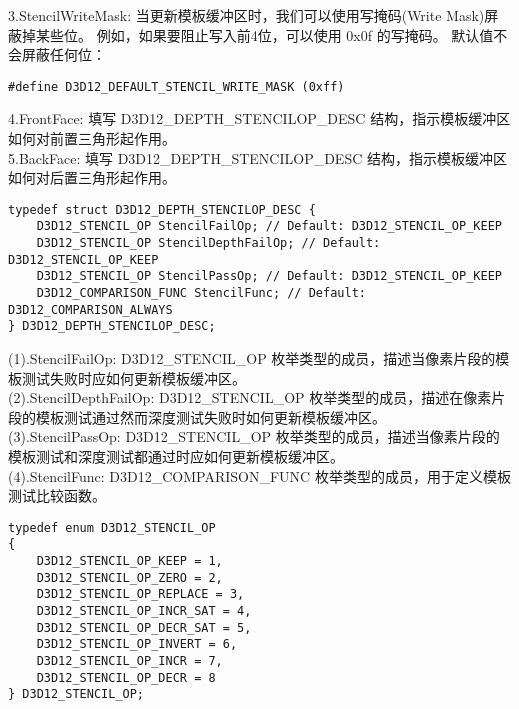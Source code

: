 \begin{flushleft}
3.StencilWriteMask: 当更新模板缓冲区时，我们可以使用写掩码(Write Mask)屏蔽掉某些位。 例如，如果要阻止写入前4位，可以使用 0x0f 的写掩码。 默认值不会屏蔽任何位：\\
\end{flushleft}
\begin{lstlisting}
#define D3D12_DEFAULT_STENCIL_WRITE_MASK (0xff)
\end{lstlisting}

\begin{flushleft}
4.FrontFace: 填写 D3D12\_DEPTH\_STENCILOP\_DESC 结构，指示模板缓冲区如何对前置三角形起作用。\\

5.BackFace: 填写 D3D12\_DEPTH\_STENCILOP\_DESC 结构，指示模板缓冲区如何对后置三角形起作用。\\
\end{flushleft}

\begin{lstlisting}
typedef struct D3D12_DEPTH_STENCILOP_DESC {
    D3D12_STENCIL_OP StencilFailOp; // Default: D3D12_STENCIL_OP_KEEP
    D3D12_STENCIL_OP StencilDepthFailOp; // Default: D3D12_STENCIL_OP_KEEP
    D3D12_STENCIL_OP StencilPassOp; // Default: D3D12_STENCIL_OP_KEEP
    D3D12_COMPARISON_FUNC StencilFunc; // Default: D3D12_COMPARISON_ALWAYS
} D3D12_DEPTH_STENCILOP_DESC;
\end{lstlisting}

\begin{flushleft}
(1).StencilFailOp: D3D12\_STENCIL\_OP 枚举类型的成员，描述当像素片段的模板测试失败时应如何更新模板缓冲区。\\
(2).StencilDepthFailOp: D3D12\_STENCIL\_OP 枚举类型的成员，描述在像素片段的模板测试通过然而深度测试失败时如何更新模板缓冲区。\\
(3).StencilPassOp: D3D12\_STENCIL\_OP 枚举类型的成员，描述当像素片段的模板测试和深度测试都通过时应如何更新模板缓冲区。\\
(4).StencilFunc: D3D12\_COMPARISON\_FUNC 枚举类型的成员，用于定义模板测试比较函数。
\end{flushleft}

\begin{lstlisting}
typedef enum D3D12_STENCIL_OP
{
    D3D12_STENCIL_OP_KEEP = 1,
    D3D12_STENCIL_OP_ZERO = 2,
    D3D12_STENCIL_OP_REPLACE = 3,
    D3D12_STENCIL_OP_INCR_SAT = 4,
    D3D12_STENCIL_OP_DECR_SAT = 5,
    D3D12_STENCIL_OP_INVERT = 6,
    D3D12_STENCIL_OP_INCR = 7,
    D3D12_STENCIL_OP_DECR = 8
} D3D12_STENCIL_OP;
\end{lstlisting}

